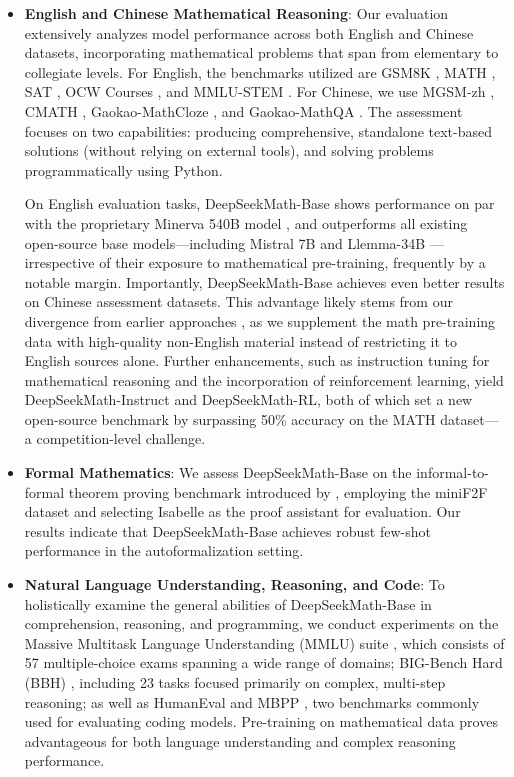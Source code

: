\begin{itemize}[topsep=0pt]
    \item \textbf{English and Chinese Mathematical Reasoning}: Our evaluation extensively analyzes model performance across both English and Chinese datasets, incorporating mathematical problems that span from elementary to collegiate levels. For English, the benchmarks utilized are GSM8K \citep{gsm8k}, MATH \citep{MATH}, SAT \citep{llemma}, OCW Courses \citep{minerva}, and MMLU-STEM \citep{mmlu}. For Chinese, we use MGSM-zh \citep{mgsm}, CMATH \citep{wei2023cmath}, Gaokao-MathCloze \citep{agieval}, and Gaokao-MathQA \citep{agieval}. The assessment focuses on two capabilities: producing comprehensive, standalone text-based solutions (without relying on external tools), and solving problems programmatically using Python.

On English evaluation tasks, DeepSeekMath-Base shows performance on par with the proprietary Minerva 540B model \citep{minerva}, and outperforms all existing open-source base models—including Mistral 7B \citep{mistral} and Llemma-34B \citep{llemma}—irrespective of their exposure to mathematical pre-training, frequently by a notable margin. Importantly, DeepSeekMath-Base achieves even better results on Chinese assessment datasets. This advantage likely stems from our divergence from earlier approaches \citep{minerva,llemma}, as we supplement the math pre-training data with high-quality non-English material instead of restricting it to English sources alone. Further enhancements, such as instruction tuning for mathematical reasoning and the incorporation of reinforcement learning, yield DeepSeekMath-Instruct and DeepSeekMath-RL, both of which set a new open-source benchmark by surpassing 50\% accuracy on the MATH dataset—a competition-level challenge.

\item \textbf{Formal Mathematics}: We assess DeepSeekMath-Base on the informal-to-formal theorem proving benchmark introduced by \citep{dsp_proof}, employing the miniF2F dataset \citep{minif2f} and selecting Isabelle \citep{isabelle} as the proof assistant for evaluation. Our results indicate that DeepSeekMath-Base achieves robust few-shot performance in the autoformalization setting.
\item \textbf{Natural Language Understanding, Reasoning, and Code}: To holistically examine the general abilities of DeepSeekMath-Base in comprehension, reasoning, and programming, we conduct experiments on the Massive Multitask Language Understanding (MMLU) suite \citep{mmlu}, which consists of 57 multiple-choice exams spanning a wide range of domains; BIG-Bench Hard (BBH) \citep{bbh}, including 23 tasks focused primarily on complex, multi-step reasoning; as well as HumanEval \citep{codex} and MBPP \citep{mbpp}, two benchmarks commonly used for evaluating coding models. Pre-training on mathematical data proves advantageous for both language understanding and complex reasoning performance.


\end{itemize}
